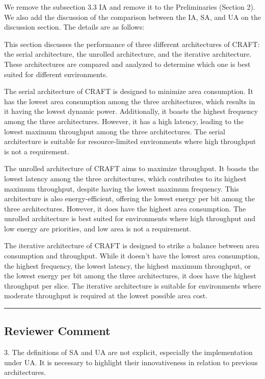 We remove the subsection 3.3 IA and remove it to the Preliminaries (Section 2). We also add the discussion of the comparison between the IA, SA, and UA on the discussion section. The details are as follows:

\color{blue}
This section discusses the performance of three different architectures of CRAFT: the serial architecture, the unrolled architecture, and the iterative architecture. These architectures are compared and analyzed to determine which one is best suited for different environments.

The serial architecture of CRAFT is designed to minimize area consumption. It has the lowest area consumption among the three architectures, which results in it having the lowest dynamic power. Additionally, it boasts the highest frequency among the three architectures. However, it has a high latency, leading to the lowest maximum throughput among the three architectures. The serial architecture is suitable for resource-limited environments where high throughput is not a requirement.

The unrolled architecture of CRAFT aims to maximize throughput. It boasts the lowest latency among the three architectures, which contributes to its highest maximum throughput, despite having the lowest maximum frequency. This architecture is also energy-efficient, offering the lowest energy per bit among the three architectures. However, it does have the highest area consumption. The unrolled architecture is best suited for environments where high throughput and low energy are priorities, and low area is not a requirement.

The iterative architecture of CRAFT is designed to strike a balance between area consumption and throughput. While it doesn't have the lowest area consumption, the highest frequency, the lowest latency, the highest maximum throughput, or the lowest energy per bit among the three architectures, it does have the highest throughput per slice. The iterative architecture is suitable for environments where moderate throughput is required at the lowest possible area cost.
\color{black}

\noindent\rule{\linewidth}{2.0pt}

\subsection{Reviewer Comment}
3. The definitions of SA and UA are not explicit, especially the implementation under UA. It is necessary to highlight their innovativeness in relation to previous architectures.


